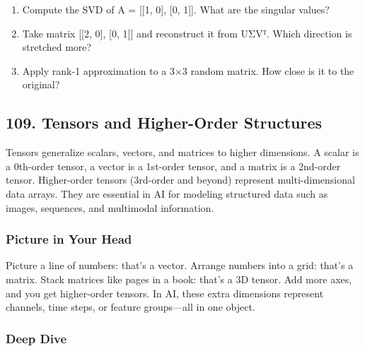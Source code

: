\documentclass[
  letterpaper,
  DIV=11,
  numbers=noendperiod]{scrreprt}
\providecommand{\tightlist}{%
  \setlength{\itemsep}{0pt}\setlength{\parskip}{0pt}}
\begin{document}
\begin{enumerate}
\def\labelenumi{\arabic{enumi}.}
\tightlist
\item
  Compute the SVD of A = {[}{[}1, 0{]}, {[}0, 1{]}{]}. What are the
  singular values?
\item
  Take matrix {[}{[}2, 0{]}, {[}0, 1{]}{]} and reconstruct it from UΣVᵀ.
  Which direction is stretched more?
\item
  Apply rank-1 approximation to a 3×3 random matrix. How close is it to
  the original?
\end{enumerate}

\subsection{109. Tensors and Higher-Order
Structures}\label{tensors-and-higher-order-structures}

Tensors generalize scalars, vectors, and matrices to higher dimensions.
A scalar is a 0th-order tensor, a vector is a 1st-order tensor, and a
matrix is a 2nd-order tensor. Higher-order tensors (3rd-order and
beyond) represent multi-dimensional data arrays. They are essential in
AI for modeling structured data such as images, sequences, and
multimodal information.

\subsubsection{Picture in Your Head}\label{picture-in-your-head-108}

Picture a line of numbers: that's a vector. Arrange numbers into a grid:
that's a matrix. Stack matrices like pages in a book: that's a 3D
tensor. Add more axes, and you get higher-order tensors. In AI, these
extra dimensions represent channels, time steps, or feature groups---all
in one object.

\subsubsection{Deep Dive}\label{deep-dive-108}
\end{document}
